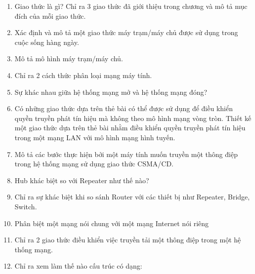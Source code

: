 \begin{multicols}{2}
  \begin{enumerate}

  \item Giao thức là gì? Chỉ ra 3 giao thức đã giới thiệu trong chương và mô tả mục đích của mỗi giao thức.

  \item Xác định và mô tả một giao thức máy trạm/máy chủ được sử dụng trong cuộc sống hàng ngày.

  \item Mô tả mô hình máy trạm/máy chủ.

  \item Chỉ ra 2 cách thức phân loại mạng máy tính.

  \item Sự khác nhau giữa hệ thống mạng mở và hệ thống mạng đóng?

  \item Có những giao thức dựa trên thẻ bài có thể được sử dụng để điều khiển quyền truyền
    phát tín hiệu mà không theo mô hình mạng vòng tròn. Thiết kế một giao thức dựa trên
    thẻ bài nhằm điều khiển quyền truyền phát tín hiệu trong một mạng LAN với mô hình mạng
    hình tuyến.

  \item Mô tả các bước thực hiện bởi một máy tính muốn truyền một thông điệp trong hệ
    thống mạng sử dụng giao thức CSMA/CD.

  \item Hub khác biệt so với Repeater như thế nào?

  \item Chỉ ra sự khác biệt khi so sánh Router với các thiết bị như Repeater, Bridge, Switch.

  \item Phân biệt một mạng nói chung với một mạng Internet nói riêng

  \item Chỉ ra 2 giao thức điều khiển việc truyền tải một thông điệp trong một hệ thống mạng.

  \item Chỉ ra xem làm thế nào cấu trúc có dạng:
  \end{enumerate}
\end{multicols}


